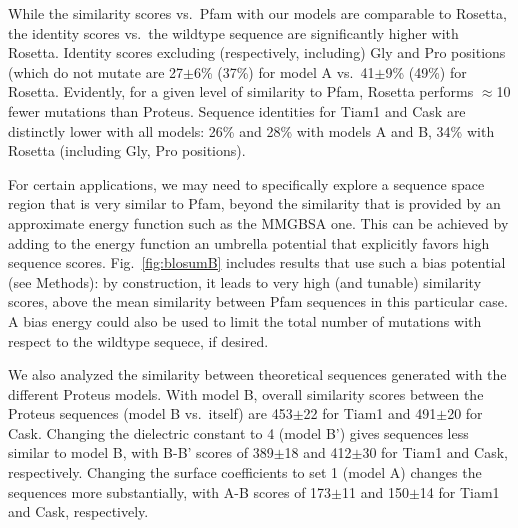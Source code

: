 \documentclass[12pt]{article}
\begin{document}
While the similarity scores vs.\ Pfam with our models are comparable to Rosetta, the identity scores vs.\ the wildtype sequence
are significantly higher with Rosetta. Identity scores excluding (respectively, including) Gly and Pro positions (which do not
mutate are 27$\pm$6\% (37\%) for model A vs.\ 41$\pm$9\% (49\%) for Rosetta. Evidently, for a given level of similarity to Pfam,
Rosetta performs $\approx$10 fewer mutations than Proteus. Sequence identities for Tiam1 and Cask are distinctly lower with
all models: 26\% and 28\% with models A and B, 34\% with Rosetta (including Gly, Pro positions).

For certain applications, we may need to specifically explore a sequence space region that is very similar to Pfam, beyond
the similarity that is provided by an approximate energy function such as the MMGBSA one. This can be achieved by adding to
the energy function an umbrella potential that explicitly favors high sequence scores. Fig.\ \ref{fig:blosumB} includes results
that use such a bias potential (see Methods): by construction, it leads to very high (and tunable) similarity scores, above the
mean similarity between Pfam sequences in this particular case. A bias energy could also be used to limit the total number of
mutations with respect to the wildtype sequece, if desired.

We also analyzed the similarity between theoretical sequences generated with the different Proteus models. With model B, overall
similarity scores between the Proteus sequences (model B vs.\ itself) are 453$\pm$22 for Tiam1 and 491$\pm$20 for Cask. Changing
the dielectric constant to 4 (model B') gives sequences less similar to model B, with B-B' scores of 389$\pm$18 and 412$\pm$30
for Tiam1 and Cask, respectively. Changing the surface coefficients to set 1 (model A) changes the sequences more substantially,
with A-B scores of 173$\pm$11 and 150$\pm$14 for Tiam1 and Cask, respectively. 
\end{document}
